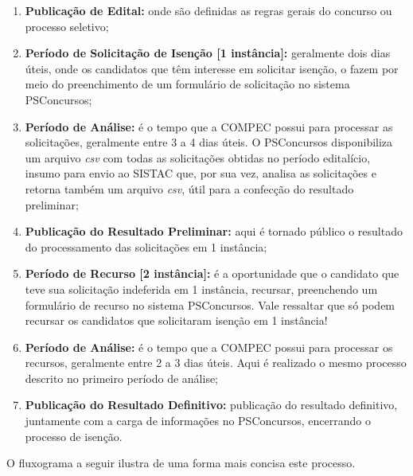 \documentclass[
	12pt,			%
	openright,		%
	oneside,	
	a4paper,		%
	english,		%
	brazil			%
]{abntex2/abntex2}  %
\begin{document}
			\begin{enumerate}
				
				\item \textbf{Publicação de Edital:} onde são definidas as regras gerais do concurso ou processo seletivo;
				\item \textbf{Período de Solicitação de Isenção [1{\textordfeminine} instância]:} geralmente dois dias úteis, onde os candidatos que têm interesse em solicitar isenção, o fazem por meio do preenchimento de um formulário de solicitação no sistema PSConcursos;
				\item \textbf{Período de Análise:} é o tempo que a COMPEC possui para processar as solicitações, geralmente entre 3 a 4 dias úteis. O PSConcursos disponibiliza um arquivo \textit{csv} com todas as solicitações obtidas no período editalício, insumo para envio ao SISTAC que, por sua vez, analisa as solicitações e retorna também um arquivo \textit{csv}, útil para a confecção do resultado preliminar;
				\item \textbf{Publicação do Resultado Preliminar:} aqui é tornado público o resultado do processamento das solicitações em 1{\textordfeminine} instância;
				\item \textbf{Período de Recurso [2{\textordfeminine} instância]:} é a oportunidade que o candidato que teve sua solicitação indeferida em 1{\textordfeminine} instância, recursar, preenchendo um formulário de recurso no sistema PSConcursos. Vale ressaltar que só podem recursar os candidatos que solicitaram isenção em 1{\textordfeminine} instância!
				\item \textbf{Período de Análise:} é o tempo que a COMPEC possui para processar os recursos, geralmente entre 2 a 3 dias úteis. Aqui é realizado o mesmo processo descrito no primeiro período de análise;
				\item \textbf{Publicação do Resultado Definitivo:} publicação do resultado definitivo, juntamente com a carga de informações no PSConcursos, encerrando o processo de isenção.
				
			\end{enumerate}
			
			O fluxograma a seguir ilustra de uma forma mais concisa este processo.
			
\end{document}
